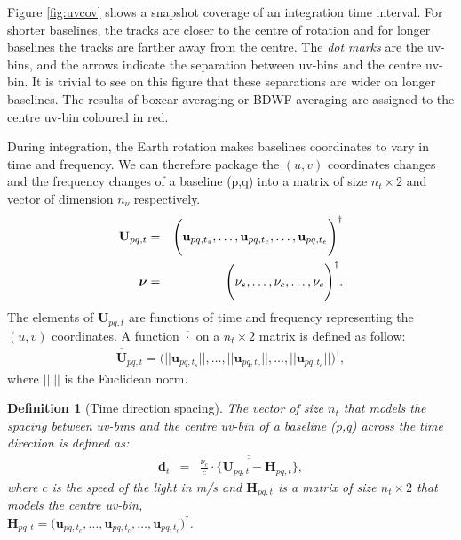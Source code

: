 \documentclass[useAMS,usenatbib]{mn2e}
\newtheorem{definition}[theorem]{Definition}
\begin{document}
Figure \ref{fig:uvcov} shows a snapshot coverage of an integration time interval. For shorter baselines, the tracks are closer to the 
centre 
of 
rotation and for longer baselines the tracks are farther away from the centre. The \textit{dot marks} are the uv-bins, 
and the  arrows indicate the separation between uv-bins and the centre uv-bin. It is trivial to see on this 
figure that these separations are wider on longer baselines. The results of boxcar averaging or BDWF averaging are assigned to the centre 
uv-bin coloured in red.

During integration, the Earth rotation makes baselines coordinates  to vary in time and 
frequency. We can therefore package the $(u,v)$ coordinates changes and the frequency changes of a baseline (p,q) into a matrix of 
size $n_t \times 2$ and  vector of dimension $n_{\nu}$ respectively. 
\begin{eqnarray*}
\mathbf{U}_{pq,t}&=& \Bigg(\mathbf{u}_{pq,t_s}, \dots , \mathbf{u}_{pq,t_c}, \dots, \mathbf{u}_{pq,t_e}\Bigg)^{\dagger}\\
 \mbox{\boldmath $\nu$}&=&\Bigg(\nu_s,\dots,\nu_c,\dots,\nu_e\Bigg)^{\dagger}.
\end{eqnarray*}
The 
elements of $\mathbf{U}_{pq,t}$ are functions of time and frequency representing the $(u,v)$ coordinates.
A function $\overline{\overline{\cdot}}$ on a $n_t \times 2$ matrix is defined as follow:
\begin{eqnarray}
\overline{\overline{\mathbf{U}}}_{pq,t}=\Bigg(||\mathbf{u}_{pq,t_s}||, \dots , ||\mathbf{u}_{pq,t_c}||, \dots, 
||\mathbf{u}_{pq,t_e}||\Bigg)^{\dagger},
\end{eqnarray}
where $||.||$ is the Euclidean norm.
\begin{definition}[Time direction spacing]
\label{def:1}
The vector of size $n_t$ that models the spacing between uv-bins and the centre uv-bin of a baseline (p,q) across the time 
direction is defined as:
\begin{eqnarray*}
 \mathbf{d}_{t} &=&\overline{\overline{\frac{\nu_c}{c}\cdot\Bigg\{\mathbf{U}_{pq,t}-\mathbf{H}_{pq,t} \Bigg \} }},
\end{eqnarray*}
where $c$ is the speed of the light in m/s and $\mathbf{H}_{pq,t}$ is a matrix of size $n_t \times 2$ that models the centre uv-bin,\\
$\mathbf{H}_{pq,t}= \big(\mathbf{u}_{pq,t_c}, \dots , \mathbf{u}_{pq,t_c}, \dots, \mathbf{u}_{pq,t_c}\big)^{\dagger}$.
\end{definition}
\end{document}
